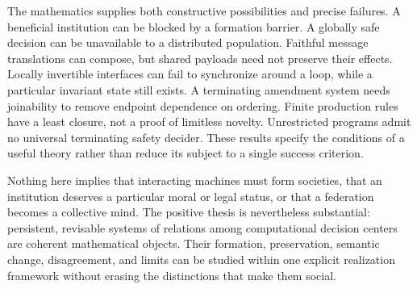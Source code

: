 \documentclass[11pt,letterpaper]{article}
\theoremstyle{plain}
\theoremstyle{definition}
\theoremstyle{remark}
\begin{document}
The mathematics supplies both constructive possibilities and precise failures. A beneficial institution can be blocked by a formation barrier. A globally safe decision can be unavailable to a distributed population. Faithful message translations can compose, but shared payloads need not preserve their effects. Locally invertible interfaces can fail to synchronize around a loop, while a particular invariant state still exists. A terminating amendment system needs joinability to remove endpoint dependence on ordering. Finite production rules have a least closure, not a proof of limitless novelty. Unrestricted programs admit no universal terminating safety decider. These results specify the conditions of a useful theory rather than reduce its subject to a single success criterion.

Nothing here implies that interacting machines must form societies, that an institution deserves a particular moral or legal status, or that a federation becomes a collective mind. The positive thesis is nevertheless substantial: persistent, revisable systems of relations among computational decision centers are coherent mathematical objects. Their formation, preservation, semantic change, disagreement, and limits can be studied within one explicit realization framework without erasing the distinctions that make them social.

\appendix
\end{document}
